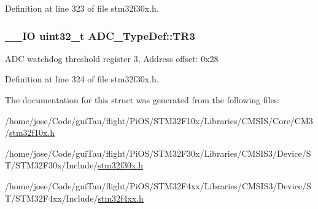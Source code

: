 Definition at line 323 of file stm32f30x.\-h.

\hypertarget{struct_a_d_c___type_def_aae8c3abfca538d1846ee561af9ef9f22}{
\subsubsection[{T\-R3}]{\setlength{\rightskip}{0pt plus 5cm}\-\_\-\-\_\-\-I\-O {\bf uint32\-\_\-t} A\-D\-C\-\_\-\-Type\-Def\-::\-T\-R3}}\label{struct_a_d_c___type_def_aae8c3abfca538d1846ee561af9ef9f22}
A\-D\-C watchdog threshold register 3, Address offset\-: 0x28 

Definition at line 324 of file stm32f30x.\-h.



The documentation for this struct was generated from the following files\-:\begin{DoxyCompactItemize}
\item 
/home/jose/\-Code/gui\-Tau/flight/\-Pi\-O\-S/\-S\-T\-M32\-F10x/\-Libraries/\-C\-M\-S\-I\-S/\-Core/\-C\-M3/\hyperlink{stm32f10x_8h}{stm32f10x.\-h}\item 
/home/jose/\-Code/gui\-Tau/flight/\-Pi\-O\-S/\-S\-T\-M32\-F30x/\-Libraries/\-C\-M\-S\-I\-S3/\-Device/\-S\-T/\-S\-T\-M32\-F30x/\-Include/\hyperlink{stm32f30x_8h}{stm32f30x.\-h}\item 
/home/jose/\-Code/gui\-Tau/flight/\-Pi\-O\-S/\-S\-T\-M32\-F4xx/\-Libraries/\-C\-M\-S\-I\-S3/\-Device/\-S\-T/\-S\-T\-M32\-F4xx/\-Include/\hyperlink{stm32f4xx_8h}{stm32f4xx.\-h}\end{DoxyCompactItemize}
